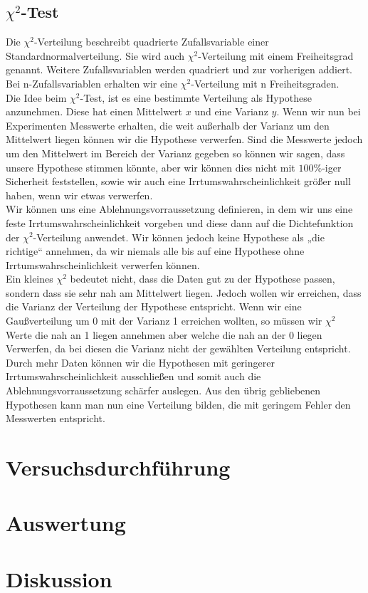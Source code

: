 \documentclass{article}
\begin{document}
	\subsection{$\chi^2$-Test}
	Die $\chi^2$-Verteilung beschreibt quadrierte Zufallsvariable einer Standardnormalverteilung. Sie wird auch $\chi^2$-Verteilung mit einem Freiheitsgrad genannt. Weitere Zufallsvariablen werden quadriert und zur vorherigen addiert. Bei n-Zufallsvariablen erhalten wir eine $\chi^2$-Verteilung mit n Freiheitsgraden.\\
	Die Idee beim $\chi^2$-Test, ist es eine bestimmte Verteilung als Hypothese anzunehmen. Diese hat einen Mittelwert $x$ und eine Varianz $y$. Wenn wir nun bei Experimenten Messwerte erhalten, die weit außerhalb der Varianz um den Mittelwert liegen können wir die Hypothese verwerfen. Sind die Messwerte jedoch um den Mittelwert im Bereich der Varianz gegeben so können wir sagen, dass unsere Hypothese stimmen könnte, aber wir können dies nicht mit $100 \%$-iger Sicherheit feststellen, sowie wir auch eine Irrtumswahrscheinlichkeit größer null haben, wenn wir etwas verwerfen.\\
	Wir können uns eine Ablehnungsvorraussetzung definieren, in dem wir uns eine feste Irrtumswahrscheinlichkeit vorgeben und diese dann auf die Dichtefunktion der $\chi^2$-Verteilung anwendet. Wir können jedoch keine Hypothese als „die richtige“ annehmen, da wir niemals alle bis auf eine Hypothese ohne Irrtumswahrscheinlichkeit verwerfen können.\\
	Ein kleines $\chi^2$ bedeutet nicht, dass die Daten gut zu der Hypothese passen, sondern dass sie sehr nah am Mittelwert liegen. Jedoch wollen wir erreichen, dass die Varianz der Verteilung der Hypothese entspricht. Wenn wir eine Gaußverteilung um 0 mit der Varianz 1 erreichen wollten, so müssen wir $\chi^2$ Werte die nah an 1 liegen annehmen aber welche die nah an der 0 liegen Verwerfen, da bei diesen die Varianz nicht der gewählten Verteilung entspricht. 
	Durch mehr Daten können wir die Hypothesen mit geringerer Irrtumswahrscheinlichkeit ausschließen und somit auch die Ablehnungsvorraussetzung schärfer auslegen. Aus den übrig gebliebenen Hypothesen kann man nun eine Verteilung bilden, die mit geringem Fehler den Messwerten entspricht.
	\newpage
	\section{Versuchsdurchführung}
	\newpage
	\section{Auswertung}
	\newpage
	\section{Diskussion}
\end{document}
